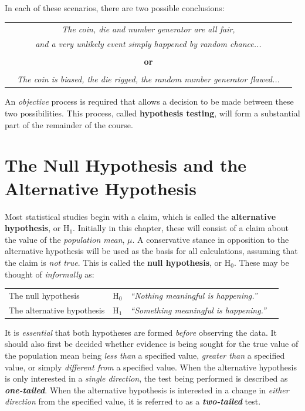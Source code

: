 \documentclass[
  11pt,
]{book}
\begin{document}
In each of these scenarios, there are two possible conclusions:

\begin{center}
\begin{tabular}{ccc}
     & \textit{The coin, die and number generator are all fair,}& \\
     & \textit{and a very unlikely event simply happened by random chance...} & \\
     && \\
     & \textbf{or} & \\
     && \\
     & \textit{The coin is biased, the die rigged, the random number generator flawed...} &
\end{tabular}
\end{center}

An \emph{objective} process is required that allows a decision to be made between these two possibilities. This process, called \textbf{hypothesis testing}, will form a substantial part of the remainder of the course.

\pagebreak

\section{The Null Hypothesis and the Alternative Hypothesis}\label{the-null-hypothesis-and-the-alternative-hypothesis}

Most statistical studies begin with a claim, which is called the \textbf{alternative hypothesis}, or \(\text{H}_\text{1}\). Initially in this chapter, these will consist of a claim about the value of the \emph{population mean}, \(\mu\). A conservative stance in opposition to the alternative hypothesis will be used as the basis for all calculations, assuming that the claim is \emph{not true}. This is called the \textbf{null hypothesis}, or \(\text{H}_\text{0}\). These may be thought of \emph{informally} as:

\begin{center}
    \begin{tabular}{llll}
        The null hypothesis & $\text{H}_\text{0}$ & \textit{``Nothing meaningful is happening.''}\\
        The alternative hypothesis & $\text{H}_\text{1}$ & \textit{``Something meaningful is happening.''}
    \end{tabular}
\end{center}

It is \emph{essential} that both hypotheses are formed \emph{before} observing the data. It should also first be decided whether evidence is being sought for the true value of the population mean being \emph{less than} a specified value, \emph{greater than} a specified value, or simply \emph{different from} a specified value. When the alternative hypothesis is only interested in a \emph{single direction}, the test being performed is described as \textbf{\emph{one-tailed}}. When the alternative hypothesis is interested in a change in \emph{either direction} from the specified value, it is referred to as a \textbf{\emph{two-tailed}} test.
\end{document}
